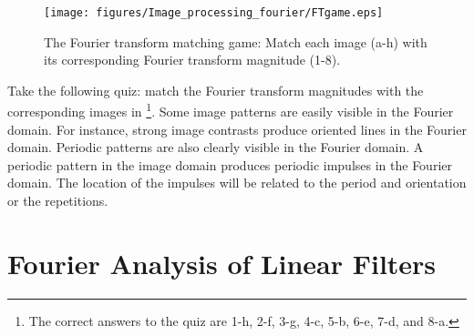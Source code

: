 %
%
%
%
%
%
%
%
%
%

\begin{figure}[H]
	\centerline{
		\texttt{[image: figures/Image\_processing\_fourier/FTgame.eps]}}
	\caption{The Fourier transform matching game: Match each image (a-h) with its corresponding Fourier transform magnitude (1-8).}
	\label{fig:quiz}
\end{figure}


Take the following quiz: match the Fourier transform magnitudes with the corresponding images in \fig{\ref{fig:quiz}}\footnote{The correct answers to the quiz \fig{\ref{fig:quiz}} are 1-h, 2-f, 3-g, 4-c, 5-b, 6-e, 7-d, and 8-a.}. Some image patterns are easily visible in the Fourier domain. For instance, strong image contrasts produce oriented lines in the Fourier domain. Periodic patterns are also clearly visible in the Fourier domain. A periodic pattern in the image domain produces periodic impulses in the Fourier domain. The location of the impulses will be related to the period and orientation or the repetitions.






\section{Fourier Analysis of Linear Filters}
\label{sect:transfer_function}


